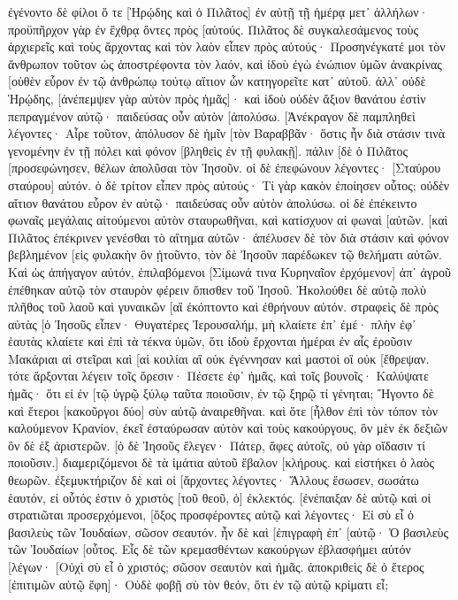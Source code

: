 ἐγένοντο δὲ φίλοι ὅ τε [Ἡρῴδης καὶ ὁ Πιλᾶτος] ἐν αὐτῇ τῇ ἡμέρᾳ μετ᾽ ἀλλήλων· προϋπῆρχον γὰρ ἐν ἔχθρᾳ ὄντες πρὸς [αὑτούς. 
Πιλᾶτος δὲ συγκαλεσάμενος τοὺς ἀρχιερεῖς καὶ τοὺς ἄρχοντας καὶ τὸν λαὸν 
εἶπεν πρὸς αὐτούς· Προσηνέγκατέ μοι τὸν ἄνθρωπον τοῦτον ὡς ἀποστρέφοντα τὸν λαόν, καὶ ἰδοὺ ἐγὼ ἐνώπιον ὑμῶν ἀνακρίνας [οὐθὲν εὗρον ἐν τῷ ἀνθρώπῳ τούτῳ αἴτιον ὧν κατηγορεῖτε κατ᾽ αὐτοῦ. 
ἀλλ᾽ οὐδὲ Ἡρῴδης, [ἀνέπεμψεν γὰρ αὐτὸν πρὸς ἡμᾶς]· καὶ ἰδοὺ οὐδὲν ἄξιον θανάτου ἐστὶν πεπραγμένον αὐτῷ· 
παιδεύσας οὖν αὐτὸν [ἀπολύσω. 
[Ἀνέκραγον δὲ παμπληθεὶ λέγοντες· Αἶρε τοῦτον, ἀπόλυσον δὲ ἡμῖν [τὸν Βαραββᾶν· 
ὅστις ἦν διὰ στάσιν τινὰ γενομένην ἐν τῇ πόλει καὶ φόνον [βληθεὶς ἐν τῇ φυλακῇ]. 
πάλιν [δὲ ὁ Πιλᾶτος [προσεφώνησεν, θέλων ἀπολῦσαι τὸν Ἰησοῦν. 
οἱ δὲ ἐπεφώνουν λέγοντες· [Σταύρου σταύρου] αὐτόν. 
ὁ δὲ τρίτον εἶπεν πρὸς αὐτούς· Τί γὰρ κακὸν ἐποίησεν οὗτος; οὐδὲν αἴτιον θανάτου εὗρον ἐν αὐτῷ· παιδεύσας οὖν αὐτὸν ἀπολύσω. 
οἱ δὲ ἐπέκειντο φωναῖς μεγάλαις αἰτούμενοι αὐτὸν σταυρωθῆναι, καὶ κατίσχυον αἱ φωναὶ [αὐτῶν. 
[καὶ Πιλᾶτος ἐπέκρινεν γενέσθαι τὸ αἴτημα αὐτῶν· 
ἀπέλυσεν δὲ τὸν διὰ στάσιν καὶ φόνον βεβλημένον [εἰς φυλακὴν ὃν ᾐτοῦντο, τὸν δὲ Ἰησοῦν παρέδωκεν τῷ θελήματι αὐτῶν. 
Καὶ ὡς ἀπήγαγον αὐτόν, ἐπιλαβόμενοι [Σίμωνά τινα Κυρηναῖον ἐρχόμενον] ἀπ᾽ ἀγροῦ ἐπέθηκαν αὐτῷ τὸν σταυρὸν φέρειν ὄπισθεν τοῦ Ἰησοῦ. 
Ἠκολούθει δὲ αὐτῷ πολὺ πλῆθος τοῦ λαοῦ καὶ γυναικῶν [αἳ ἐκόπτοντο καὶ ἐθρήνουν αὐτόν. 
στραφεὶς δὲ πρὸς αὐτὰς [ὁ Ἰησοῦς εἶπεν· Θυγατέρες Ἰερουσαλήμ, μὴ κλαίετε ἐπ᾽ ἐμέ· πλὴν ἐφ᾽ ἑαυτὰς κλαίετε καὶ ἐπὶ τὰ τέκνα ὑμῶν, 
ὅτι ἰδοὺ ἔρχονται ἡμέραι ἐν αἷς ἐροῦσιν Μακάριαι αἱ στεῖραι καὶ [αἱ κοιλίαι αἳ οὐκ ἐγέννησαν καὶ μαστοὶ οἳ οὐκ [ἔθρεψαν. 
τότε ἄρξονται λέγειν τοῖς ὄρεσιν· Πέσετε ἐφ᾽ ἡμᾶς, καὶ τοῖς βουνοῖς· Καλύψατε ἡμᾶς· 
ὅτι εἰ ἐν [τῷ ὑγρῷ ξύλῳ ταῦτα ποιοῦσιν, ἐν τῷ ξηρῷ τί γένηται; 
Ἤγοντο δὲ καὶ ἕτεροι [κακοῦργοι δύο] σὺν αὐτῷ ἀναιρεθῆναι. 
καὶ ὅτε [ἦλθον ἐπὶ τὸν τόπον τὸν καλούμενον Κρανίον, ἐκεῖ ἐσταύρωσαν αὐτὸν καὶ τοὺς κακούργους, ὃν μὲν ἐκ δεξιῶν ὃν δὲ ἐξ ἀριστερῶν. 
[ὁ δὲ Ἰησοῦς ἔλεγεν· Πάτερ, ἄφες αὐτοῖς, οὐ γὰρ οἴδασιν τί ποιοῦσιν.] διαμεριζόμενοι δὲ τὰ ἱμάτια αὐτοῦ ἔβαλον [κλήρους. 
καὶ εἱστήκει ὁ λαὸς θεωρῶν. ἐξεμυκτήριζον δὲ καὶ οἱ [ἄρχοντες λέγοντες· Ἄλλους ἔσωσεν, σωσάτω ἑαυτόν, εἰ οὗτός ἐστιν ὁ χριστὸς [τοῦ θεοῦ, ὁ] ἐκλεκτός. 
[ἐνέπαιξαν δὲ αὐτῷ καὶ οἱ στρατιῶται προσερχόμενοι, [ὄξος προσφέροντες αὐτῷ 
καὶ λέγοντες· Εἰ σὺ εἶ ὁ βασιλεὺς τῶν Ἰουδαίων, σῶσον σεαυτόν. 
ἦν δὲ καὶ [ἐπιγραφὴ ἐπ᾽ [αὐτῷ· Ὁ βασιλεὺς τῶν Ἰουδαίων [οὗτος. 
Εἷς δὲ τῶν κρεμασθέντων κακούργων ἐβλασφήμει αὐτόν [λέγων· [Οὐχὶ σὺ εἶ ὁ χριστός; σῶσον σεαυτὸν καὶ ἡμᾶς. 
ἀποκριθεὶς δὲ ὁ ἕτερος [ἐπιτιμῶν αὐτῷ ἔφη]· Οὐδὲ φοβῇ σὺ τὸν θεόν, ὅτι ἐν τῷ αὐτῷ κρίματι εἶ; 
